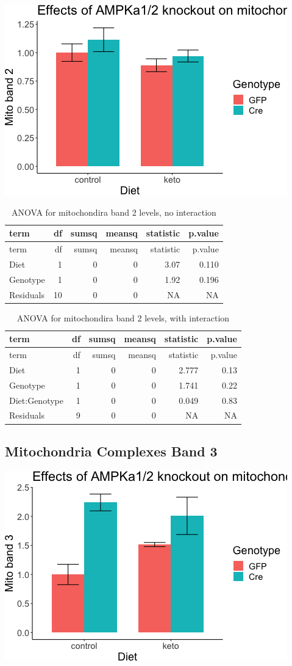 \documentclass[]{article}
\begin{document}
\includegraphics{figures/mitoband2-barplot-1.png}

\begin{longtable}[]{@{}lrrrrr@{}}
\caption{ANOVA for mitochondira band 2 levels, no
interaction}\tabularnewline
\toprule
term & df & sumsq & meansq & statistic & p.value\tabularnewline
\midrule
\endfirsthead
\toprule
term & df & sumsq & meansq & statistic & p.value\tabularnewline
\midrule
\endhead
Diet & 1 & 0 & 0 & 3.07 & 0.110\tabularnewline
Genotype & 1 & 0 & 0 & 1.92 & 0.196\tabularnewline
Residuals & 10 & 0 & 0 & NA & NA\tabularnewline
\bottomrule
\end{longtable}

\begin{longtable}[]{@{}lrrrrr@{}}
\caption{ANOVA for mitochondira band 2 levels, with
interaction}\tabularnewline
\toprule
term & df & sumsq & meansq & statistic & p.value\tabularnewline
\midrule
\endfirsthead
\toprule
term & df & sumsq & meansq & statistic & p.value\tabularnewline
\midrule
\endhead
Diet & 1 & 0 & 0 & 2.777 & 0.13\tabularnewline
Genotype & 1 & 0 & 0 & 1.741 & 0.22\tabularnewline
Diet:Genotype & 1 & 0 & 0 & 0.049 & 0.83\tabularnewline
Residuals & 9 & 0 & 0 & NA & NA\tabularnewline
\bottomrule
\end{longtable}

\hypertarget{mitochondria-complexes-band-3}{%
\subsection{Mitochondria Complexes Band
3}\label{mitochondria-complexes-band-3}}

\includegraphics{figures/mitoband3-barplot-1.png}
\end{document}
